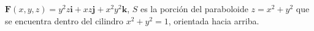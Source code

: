 \item $\mathbf{F}(x, y, z) = y^2z \mathbf{i} + xz \mathbf{j} + x^2y^2 \mathbf{k}$, $S$ es la porción del paraboloide $z = x^2 + y^2$ que se encuentra dentro del cilindro $x^2 + y^2 = 1$, orientada hacia arriba.
